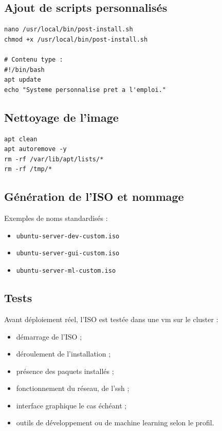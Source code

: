 \subsection{Ajout de scripts personnalisés}

\begin{lstlisting}[basicstyle=\ttfamily\footnotesize, frame=single]
nano /usr/local/bin/post-install.sh
chmod +x /usr/local/bin/post-install.sh

# Contenu type :
#!/bin/bash
apt update
echo "Systeme personnalise pret a l'emploi."
\end{lstlisting}

\subsection{Nettoyage de l'image}

\begin{lstlisting}[basicstyle=\ttfamily\footnotesize, frame=single]
apt clean
apt autoremove -y
rm -rf /var/lib/apt/lists/*
rm -rf /tmp/*
\end{lstlisting}

\subsection{Génération de l'ISO et nommage}

Exemples de noms standardisés :
\begin{itemize}[leftmargin=*]
    \item \texttt{ubuntu-server-dev-custom.iso}
    \item \texttt{ubuntu-server-gui-custom.iso}
    \item \texttt{ubuntu-server-ml-custom.iso}
\end{itemize}

\subsection{Tests}

Avant déploiement réel, l'ISO est testée dans une \acrshort{vm} sur le cluster :
\begin{itemize}[leftmargin=*]
    \item démarrage de l'ISO ;
    \item déroulement de l'installation ;
    \item présence des paquets installés ;
    \item fonctionnement du réseau, de l'\acrshort{ssh} ;
    \item interface graphique le cas échéant ;
    \item outils de développement ou de machine learning selon le profil.
\end{itemize}

